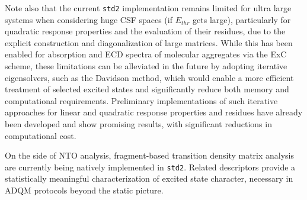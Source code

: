 \documentclass[%
 aip,
 amsmath,amssymb,
preprint,%
]{revtex4-2}
\begin{document}
Note also that the current \texttt{std2} implementation remains limited for ultra large systems when considering huge CSF spaces (if $E_{thr}$ gets large), particularly for quadratic response properties and the evaluation of their residues, due to the explicit construction and diagonalization of large matrices. 
While this has been enabled for absorption and ECD spectra of molecular aggregates via the ExC scheme,\cite{paulsEfficientExcitonCoupling2025} 
these limitations can be alleviated in the future by adopting iterative eigensolvers, such as the Davidson method, which would enable a more efficient treatment of selected excited states and significantly reduce both memory and computational requirements.\cite{kauczorEfficiencyAlgorithmsSolving2011,KauczorEfficient2014}
Preliminary implementations of such iterative approaches for linear and quadratic response properties and residues have already been developed and show promising results, with significant reductions in computational cost.

On the side of NTO analysis, fragment-based transition density matrix analysis\cite{plasserAnalysisExcitonicCharge2012} are currently being natively implemented in \texttt{std2}. 
Related descriptors provide a statistically meaningful characterization of excited state character, necessary in ADQM protocols beyond the static picture.
\end{document}
